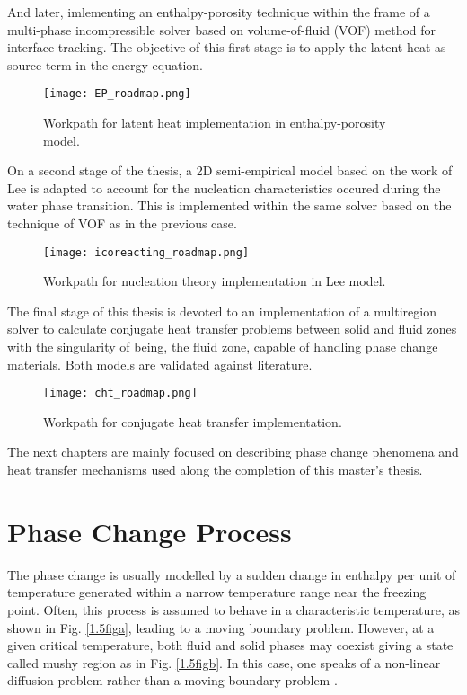 \noindent And later, imlementing an enthalpy-porosity technique within the frame of a multi-phase incompressible solver based on volume-of-fluid (VOF) method for interface tracking. The objective of this first stage is to apply the latent heat as source term in the energy equation. 
\begin{figure}[h!]
	\centering
	\texttt{[image: EP\_roadmap.png]}
	\caption{Workpath for latent heat implementation in enthalpy-porosity model.} 
	\label{1.2fig}
\end{figure}
\newline
On a second stage of the thesis, a 2D semi-empirical model based on the work of Lee is adapted to account for the nucleation characteristics occured during the water phase transition. This is implemented within the same solver based on the technique of VOF as in the previous case.
\begin{figure}[h!]
	\centering
	\texttt{[image: icoreacting\_roadmap.png]}
	\caption{Workpath for nucleation theory implementation in Lee model.} 
	\label{1.3fig}
\end{figure}
\newline
\noindent The final stage of this thesis is devoted to an implementation of a multiregion solver to calculate conjugate heat transfer problems between solid and fluid zones with the singularity of being, the fluid zone, capable of handling phase change materials. Both models are validated against literature.
\clearpage
\begin{figure}[h!]
	\centering
	\texttt{[image: cht\_roadmap.png]}
	\caption{Workpath for conjugate heat transfer implementation.} 
	\label{1.4fig}
\end{figure}

\noindent The next chapters are mainly focused on describing phase change phenomena and heat transfer mechanisms used along the completion of this master's thesis.


\clearpage
\section{Phase Change Process}
\setlength{\parindent}{0.5cm} The phase change is usually modelled by a sudden change in enthalpy per unit of temperature generated within a narrow temperature range near the freezing point. Often, this process is assumed to behave in a characteristic temperature, as shown in Fig. \ref{1.5figa}, leading to a moving boundary problem. However, at a given critical temperature, both fluid and solid phases may coexist giving a state called mushy region as in Fig. \ref{1.5figb}. In this case, one speaks of a non-linear diffusion problem rather than a moving boundary problem \cite{krabbenhoft_damkilde_nazem_2006}. 
 
